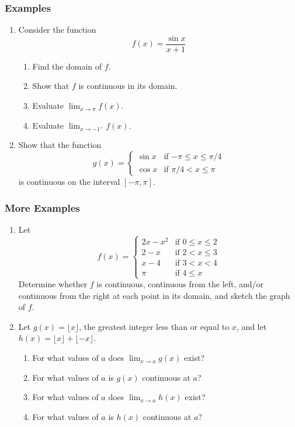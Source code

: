 \documentclass[serif,ignorenonframetext]{beamer}
\newcommand{\ds}{\displaystyle}
\begin{document}
\begin{frame}
  \frametitle{Examples}
  \begin{enumerate}
  \item Consider the function
    \begin{displaymath}
      f(x) = \frac{\sin x}{x+1}
    \end{displaymath}
    \begin{enumerate}
    \item Find the domain of $f$.
    \item Show that $f$ is continuous in its domain.
    \item Evaluate $\ds \lim_{x\to \pi} f(x)$.
    \item Evaluate $\ds \lim_{x\to -1^+} f(x)$.
    \end{enumerate}
  \item Show that the function
    \begin{displaymath}
      g(x) = \begin{cases}
        \sin x & \mbox{if $-\pi    \le x \le \pi/4$} \\
	\cos x & \mbox{if $\pi/4   <   x \le \pi$}
      \end{cases}
    \end{displaymath}
    is continuous on the interval $[-\pi,\pi]$.
  \end{enumerate}
\end{frame}

\begin{frame}
  \frametitle{More Examples}
  \begin{enumerate}
  \item Let
    \begin{displaymath}
      f(x) = \begin{cases}
        2x-x^2 & \mbox{if $0\le x \le 2$} \\
	2-x    & \mbox{if $2<   x \le 3$} \\
	x-4    & \mbox{if $3<   x <   4$} \\
	\pi    & \mbox{if $4\le x$}
      \end{cases}
    \end{displaymath}
    Determine whether $f$ is continuous, continuous from the left, and/or
    continuous from the right
    at each point in its domain, and sketch the graph of $f$.
  \item Let $g(x)=\lfloor x \rfloor$, the greatest integer less than or equal
    to $x$, and let $h(x) = \lfloor x \rfloor + \lfloor -x \rfloor$.
    \begin{enumerate}
    \item For what values of $a$ does $\lim_{x\to a} g(x)$ exist?
    \item For what values of $a$ is $g(x)$ continuous at $a$?
    \item For what values of $a$ does $\lim_{x\to a} h(x)$ exist?
    \item For what values of $a$ is $h(x)$ continuous at $a$?
    \end{enumerate}
  \end{enumerate} 
\end{frame}
\end{document}
